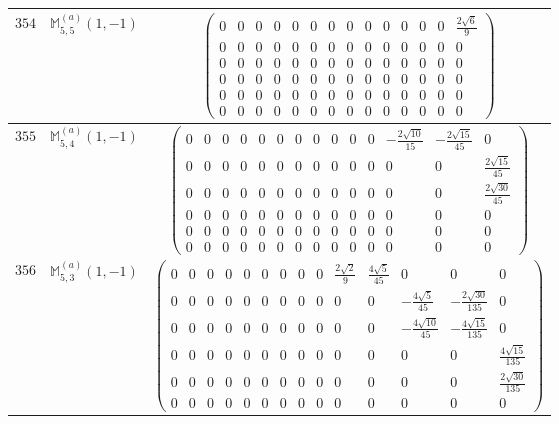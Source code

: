 \documentclass[fleqn,8pt,landscape]{jsarticle}
\begin{document}
\begin{center}
\begin{longtable}{ccc}
$ 354 $ & $ \mathbb{M}_{5,5}^{(a)}(1,-1) $ & $ \begin{pmatrix} 0 & 0 & 0 & 0 & 0 & 0 & 0 & 0 & 0 & 0 & 0 & 0 & 0 & \frac{2 \sqrt{6}}{9} \\ 0 & 0 & 0 & 0 & 0 & 0 & 0 & 0 & 0 & 0 & 0 & 0 & 0 & 0 \\ 0 & 0 & 0 & 0 & 0 & 0 & 0 & 0 & 0 & 0 & 0 & 0 & 0 & 0 \\ 0 & 0 & 0 & 0 & 0 & 0 & 0 & 0 & 0 & 0 & 0 & 0 & 0 & 0 \\ 0 & 0 & 0 & 0 & 0 & 0 & 0 & 0 & 0 & 0 & 0 & 0 & 0 & 0 \\ 0 & 0 & 0 & 0 & 0 & 0 & 0 & 0 & 0 & 0 & 0 & 0 & 0 & 0 \end{pmatrix} $ \\ \hline
$ 355 $ & $ \mathbb{M}_{5,4}^{(a)}(1,-1) $ & $ \begin{pmatrix} 0 & 0 & 0 & 0 & 0 & 0 & 0 & 0 & 0 & 0 & 0 & - \frac{2 \sqrt{10}}{15} & - \frac{2 \sqrt{15}}{45} & 0 \\ 0 & 0 & 0 & 0 & 0 & 0 & 0 & 0 & 0 & 0 & 0 & 0 & 0 & \frac{2 \sqrt{15}}{45} \\ 0 & 0 & 0 & 0 & 0 & 0 & 0 & 0 & 0 & 0 & 0 & 0 & 0 & \frac{2 \sqrt{30}}{45} \\ 0 & 0 & 0 & 0 & 0 & 0 & 0 & 0 & 0 & 0 & 0 & 0 & 0 & 0 \\ 0 & 0 & 0 & 0 & 0 & 0 & 0 & 0 & 0 & 0 & 0 & 0 & 0 & 0 \\ 0 & 0 & 0 & 0 & 0 & 0 & 0 & 0 & 0 & 0 & 0 & 0 & 0 & 0 \end{pmatrix} $ \\ \hline
$ 356 $ & $ \mathbb{M}_{5,3}^{(a)}(1,-1) $ & $ \begin{pmatrix} 0 & 0 & 0 & 0 & 0 & 0 & 0 & 0 & 0 & \frac{2 \sqrt{2}}{9} & \frac{4 \sqrt{5}}{45} & 0 & 0 & 0 \\ 0 & 0 & 0 & 0 & 0 & 0 & 0 & 0 & 0 & 0 & 0 & - \frac{4 \sqrt{5}}{45} & - \frac{2 \sqrt{30}}{135} & 0 \\ 0 & 0 & 0 & 0 & 0 & 0 & 0 & 0 & 0 & 0 & 0 & - \frac{4 \sqrt{10}}{45} & - \frac{4 \sqrt{15}}{135} & 0 \\ 0 & 0 & 0 & 0 & 0 & 0 & 0 & 0 & 0 & 0 & 0 & 0 & 0 & \frac{4 \sqrt{15}}{135} \\ 0 & 0 & 0 & 0 & 0 & 0 & 0 & 0 & 0 & 0 & 0 & 0 & 0 & \frac{2 \sqrt{30}}{135} \\ 0 & 0 & 0 & 0 & 0 & 0 & 0 & 0 & 0 & 0 & 0 & 0 & 0 & 0 \end{pmatrix} $ \\ \hline

\end{longtable}
\end{center}
\end{document}

